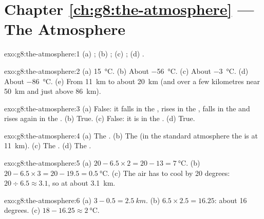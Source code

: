 \section*{Chapter \ref{ch:g8:the-atmosphere} --- The Atmosphere}

\begin{solution}{exo:g8:the-atmosphere:1}
(a) ; (b) ; (c) ; (d) .
\end{solution}

\begin{solution}{exo:g8:the-atmosphere:2}
(a) \qty{15}{\degreeCelsius}. (b) About \qty{-56}{\degreeCelsius}.
(c) About \qty{-3}{\degreeCelsius}. (d) About \qty{-86}{\degreeCelsius}.
(e) From \qty{11}{km} to about \qty{20}{km} (and over a few kilometres
near \qty{50}{km} and just above \qty{86}{km}).
\end{solution}

\begin{solution}{exo:g8:the-atmosphere:3}
(a) False: it falls in the , rises in the , falls
in the  and rises again in the . (b) True.
(c) False: it is in the . (d) True.
\end{solution}

\begin{solution}{exo:g8:the-atmosphere:4}
(a) The . (b) The  (in the standard atmosphere the
 is at \qty{11}{km}). (c) The . (d) The .
\end{solution}

\begin{solution}{exo:g8:the-atmosphere:5}
(a) $20 - 6.5 \times 2 = 20 - 13 = \qty{7}{\degreeCelsius}$. (b) $20 -
6.5 \times 3 = 20 - 19.5 = \qty{0.5}{\degreeCelsius}$. (c) The air has to
cool by 20 degrees: $20 \div 6.5 \approx 3.1$, so at about
\qty{3.1}{km}.
\end{solution}

\begin{solution}{exo:g8:the-atmosphere:6}
(a) $3 - 0.5 = \qty{2.5}{km}$. (b) $6.5 \times 2.5 = 16.25$: about 16
degrees. (c) $18 - 16.25 \approx \qty{2}{\degreeCelsius}$.
\end{solution}

